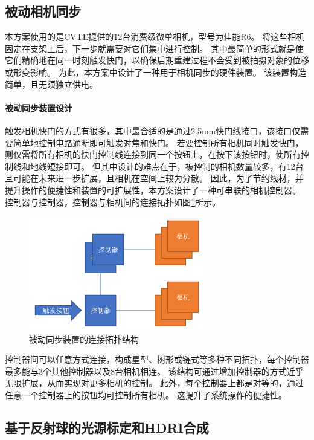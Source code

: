 \subsection{被动相机同步}
\label{sec:passive_sync}

本方案使用的是CVTE提供的12台消费级微单相机，型号为佳能R6。
将这些相机固定在支架上后，下一步就需要对它们集中进行控制。
其中最简单的形式就是使它们精确地在同一时刻触发快门，以确保后期重建过程不会受到被拍摄对象的位移或形变影响。
为此，本方案中设计了一种用于相机同步的硬件装置。
该装置构造简单，且无须独立供电。

\paragraph{被动同步装置设计}
触发相机快门的方式有很多，其中最合适的是通过2.5mm快门线接口，该接口仅需要简单地控制电路通断即可触发对焦和快门。
若要控制所有相机同时触发快门，则仅需将所有相机的快门控制线连接到同一个按钮上，在按下该按钮时，使所有控制线和地线短接即可。
但其中设计的难点在于，被控制的相机数量较多，有12台且可能在未来进一步扩展，且相机在空间上较为分散。
因此，为了节约线材，并提升操作的便捷性和装置的可扩展性，本方案设计了一种可串联的相机控制器。
控制器与控制器，控制器与相机间的连接拓扑如图\ref{fig:passive_sync_topo}所示。
\begin{figure}
    \centering
    \includegraphics[height=5cm]{figures/passive_sync_topo}
    \caption{被动同步装置的连接拓扑结构}
    \label{fig:passive_sync_topo}
\end{figure}
控制器间可以任意方式连接，构成星型、树形或链式等多种不同拓扑，每个控制器最多能与3个其他控制器以及8台相机相连。
该结构可通过增加控制器的方式近乎无限扩展，从而实现对更多相机的控制。
此外，每个控制器上都是对等的，通过任意一个控制器上的按钮均可控制所有相机。
这提升了系统操作的便捷性。



\subsection{基于反射球的光源标定和HDRI合成}
\label{sec:light_calib}

